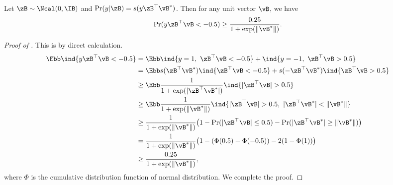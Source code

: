 \documentclass[11pt]{article}
\begin{document}
\begin{lemma}\label{lemma:zero-one:failure-prob}
Let $\zB\sim\Ncal(0, \IB)$ and $\Pr(y|\zB)=s(y \zB^\top\vB^*)$.
Then for any unit vector $\vB$, we have
\begin{align*}
     \Pr(y \zB^\top \vB < - 0.5) \ge \frac{0.25}{1+\exp(\|\vB^*\|)}.
\end{align*}
\end{lemma}
\begin{proof}[Proof of ]
This is by direct calculation.
\begin{align*}
    \Ebb \ind{y \zB^\top \vB < - 0.5 } 
    &= \Ebb \ind{y=1,\ \zB^\top \vB < -0.5} + \ind{y=-1,\ \zB^\top \vB > 0.5} \\
    &= \Ebb s(\zB^\top \vB^*) \ind{ \zB^\top \vB < -0.5} + s(-\zB^\top \vB^*) \ind{ \zB^\top \vB > 0.5} \\
    &\ge\Ebb  \frac{1}{1+\exp(|\zB^\top \vB^*|)} \ind{ |\zB^\top \vB| > 0.5} \\
    &\ge\Ebb \frac{1}{1+\exp(\|\vB^*\|)} \ind{ |\zB^\top \vB| > 0.5,\ | \zB^\top \vB^* | < \|\vB^*\| } \\
    &\ge \frac{1}{1+\exp(\|\vB^*\|)} \big( 1- \Pr(|\zB^\top \vB| \le 0.5) - \Pr(| \zB^\top \vB^* | \ge \|\vB^*\|) \big) \\
    &= \frac{1}{1+\exp(\|\vB^*\|)}\big(1- ( \Phi(0.5)-\Phi(-0.5))- 2 (1-\Phi(1))  \big) \\
    &\ge \frac{0.25}{1+\exp(\|\vB^*\|)},
\end{align*}
where $\Phi$ is the cumulative distribution function of normal distribution. We complete the proof.
\end{proof}
\end{document}
